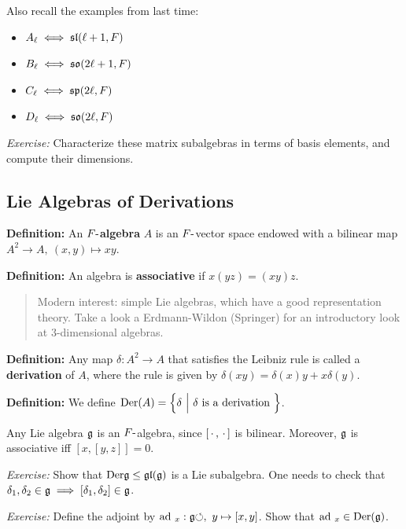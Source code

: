 Also recall the examples from last time:

\begin{itemize}
\tightlist
\item
  \(A_\ell \iff {\mathfrak{sl}}(\ell + 1, F)\)
\item
  \(B_\ell \iff {\mathfrak{so}}(2\ell + 1, F)\)
\item
  \(C_\ell \iff {\mathfrak{sp}}(2\ell, F)\)
\item
  \(D_\ell \iff {\mathfrak{so}}(2\ell, F)\)
\end{itemize}

\emph{Exercise:} Characterize these matrix subalgebras in terms of basis
elements, and compute their dimensions.

\hypertarget{lie-algebras-of-derivations}{%
\subsection{Lie Algebras of
Derivations}\label{lie-algebras-of-derivations}}

\textbf{Definition:} An \textbf{\(F{\hbox{-}}\)algebra} \(A\) is an
\(F{\hbox{-}}\)vector space endowed with a bilinear map
\(A^2 \to A,~ (x,y) \mapsto xy\).

\textbf{Definition:} An algebra is \textbf{associative} if
\(x(yz) = (xy)z\).

\begin{quote}
Modern interest: simple Lie algebras, which have a good representation
theory. Take a look a Erdmann-Wildon (Springer) for an introductory look
at 3-dimensional algebras.
\end{quote}

\textbf{Definition:} Any map \(\delta: A^2 \to A\) that satisfies the
Leibniz rule is called a \textbf{derivation} of \(A\), where the rule is
given by \(\delta(xy) = \delta(x)y + x\delta(y)\).

\textbf{Definition:} We define
\(\mathrm{Der}(A) = \left\{{\delta {~\mathrel{\Big|}~} \delta\text{ is a derivation }}\right\}\).

Any Lie algebra \({\mathfrak{g}}\) is an \(F{\hbox{-}}\)algebra, since
\([{\,\cdot\,}, {\,\cdot\,}]\) is bilinear. Moreover, \({\mathfrak{g}}\) is associative iff
\([x, [y,z]] = 0\).

\emph{Exercise:} Show that \(\mathrm{Der} {\mathfrak{g}} \leq {\mathfrak{gl}}({\mathfrak{g}})\) is
a Lie subalgebra. One needs to check that
\(\delta_1, \delta_2 \in {\mathfrak{g}} \implies [\delta_1, \delta_2] \in {\mathfrak{g}}\).

\emph{Exercise:} Define the adjoint by
\(\mathrm{ad}~_x: {\mathfrak{g}}{\circlearrowleft},~ y \mapsto [x, y]\). Show that
\(\mathrm{ad}~_x \in \mathrm{Der}({\mathfrak{g}})\).

